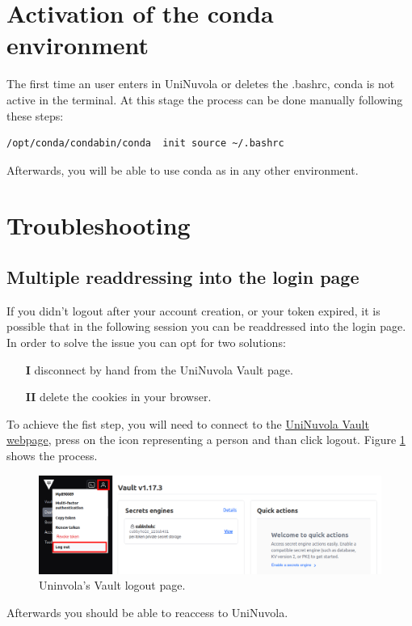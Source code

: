 \section{Activation of the conda environment}
The first time an user enters in UniNuvola or deletes the .bashrc, conda is not active in the terminal. At this stage
the process can be done manually following these steps:
\begin{lstlisting}[language=bash] 
/opt/conda/condabin/conda  init source ~/.bashrc
\end{lstlisting}
Afterwards, you will be able to use conda as in any other environment.

\section{Troubleshooting}
\subsection{Multiple readdressing into the login page}
If you didn't logout after your account creation, or your token expired, it is possible that in the following session
you can be readdressed into the login page.  In order to solve the issue you can opt for two solutions:
\begin{itemize}
    \item[\textbf{I}] disconnect by hand from the UniNuvola Vault page.
    \item[\textbf{II}] delete the cookies in your browser.
\end{itemize}

To achieve the fist step, you will need to connect to the
\href{https://vault.uninuvola.unipg.it:8200/ui/vault/dashboard}{UniNuvola Vault webpage}, press on the icon representing
a person and than click logout. Figure \ref{img:logout} shows the process.      \\
\begin{figure}[!h]
    \center
    \includegraphics[width=0.8\linewidth]{img/vault.png}
    \caption{Uninvola's Vault logout page.}
    \label{img:logout}
\end{figure}

Afterwards you should be able to reaccess to UniNuvola.

